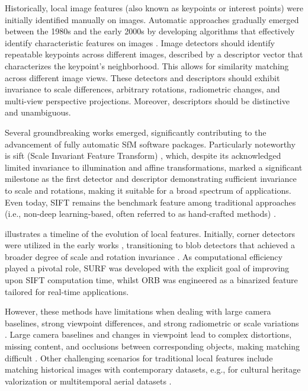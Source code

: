 Historically, local image features (also known as keypoints or interest points) were initially identified manually on images.
Automatic approaches gradually emerged between the 1980s and the early 2000s by developing algorithms that effectively identify characteristic features on images \citep{Lowe2004}.
Image detectors should identify repeatable keypoints across different images, described by a descriptor vector that characterizes the keypoint's neighborhood. 
This allows for similarity matching across different image views. 
These detectors and descriptors should exhibit invariance to scale differences, arbitrary rotations, radiometric changes, and multi-view perspective projections. 
Moreover, descriptors should be distinctive and unambiguous.  

Several groundbreaking works emerged, significantly contributing to the advancement of fully automatic SfM software packages. 
Particularly noteworthy is \acs{sift} (Scale Invariant Feature Transform) \citep{Lowe2004}, which, despite its acknowledged limited invariance to illumination and affine transformations, marked a significant milestone as the first detector and descriptor demonstrating sufficient invariance to scale and rotations, making it suitable for a broad spectrum of applications. 
Even today, SIFT remains the benchmark feature among traditional approaches (i.e., non-deep learning-based, often referred to as hand-crafted methods) \citep{jin_image_2021}. 

 illustrates a timeline of the evolution of local features. 
Initially, corner detectors were utilized in the early works \citep{Harris1988ACC}, transitioning to blob detectors that achieved a broader degree of scale and rotation invariance \citep{Lowe2004}. 
As computational efficiency played a pivotal role, SURF \citep{bay_surf_2006} was developed with the explicit goal of improving upon SIFT computation time, whilst ORB \citep{Rublee2011} was engineered as a binarized feature tailored for real-time applications. 

However, these methods have limitations when dealing with large camera baselines, strong viewpoint differences, and strong radiometric or scale variations \citep{Yao_2021}. 
Large camera baselines and changes in viewpoint lead to complex distortions, missing content, and occlusions between corresponding objects, making matching difficult \citep{jin_image_2021, ioli2024deep}.
Other challenging scenarios for traditional local features include matching historical images with contemporary datasets, e.g., for cultural heritage valorization \citep{Maiwald2021_Historical, Maiwald2023_HAI-SFM} or multitemporal aerial datasets \citep{Farella2022, Zhang2021_featmatc_histo}.

